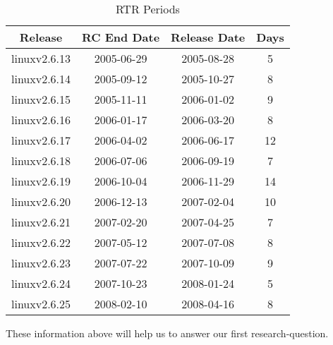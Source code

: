 \documentclass{acm_proc_article-sp}
\begin{document}
\begin{table}[ht]
\caption{RTR Periods}  %
\centering 						%
\begin{tabular}{c c c c}				%
\hline\hline						%
Release 			& RC End Date	& Release Date	& Days \\ [0.5ex]
\hline 							%
linuxv2.6.13		& 2005-06-29	& 2005-08-28	& 5 \\
linuxv2.6.14		& 2005-09-12	& 2005-10-27	& 8 \\
linuxv2.6.15		& 2005-11-11	& 2006-01-02	& 9 \\
linuxv2.6.16		& 2006-01-17	& 2006-03-20	& 8 \\
linuxv2.6.17		& 2006-04-02	& 2006-06-17	& 12 \\
linuxv2.6.18		& 2006-07-06	& 2006-09-19	& 7 \\
linuxv2.6.19		& 2006-10-04	& 2006-11-29	& 14 \\
linuxv2.6.20  		& 2006-12-13	& 2007-02-04	& 10 \\
linuxv2.6.21		& 2007-02-20	& 2007-04-25	& 7 \\
linuxv2.6.22		& 2007-05-12	& 2007-07-08	& 8 \\
linuxv2.6.23		& 2007-07-22	& 2007-10-09	& 9 \\
linuxv2.6.24		& 2007-10-23	& 2008-01-24	& 5 \\
linuxv2.6.25		& 2008-02-10	& 2008-04-16	& 8 \\
[1ex]							%
\hline 							%
\end{tabular}
\label{table:nonlin} 				%
\end{table}

These information above will help us to answer our first research-question.
\end{document}
